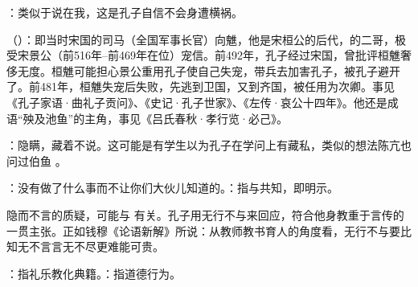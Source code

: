 {
}
{}


{
\item {}：类似于说在我，这是孔子自信不会身遭横祸。

\item {}（）：即当时宋国的司马（全国军事长官）向魋，他是宋桓公的后代，的二哥，极受宋景公（前516年--前469年在位）宠信。前492年，孔子经过宋国，曾批评桓魋奢侈无度。桓魋可能担心景公重用孔子使自己失宠，带兵去加害孔子，被孔子避开了。前481年，桓魋失宠后失败，先逃到卫国，又到齐国，被任用为次卿。事见《孔子家语·曲礼子贡问》、《史记·孔子世家》、《左传·哀公十四年》。他还是成语“殃及池鱼”的主角，事见《吕氏春秋·孝行览·必己》。%
}
{}


{
\begin{lyblobitemize}
\item {}：隐瞒，藏着不说。这可能是有学生以为孔子在学问上有藏私，类似的想法陈亢也问过伯鱼 。
\item {}：没有做了什么事而不让你们大伙儿知道的。：指与共知，即明示。
\end{lyblobitemize}
隐而不言的质疑，可能与  有关。孔子用无行不与来回应，符合他身教重于言传的一贯主张。正如钱穆《论语新解》所说：从教师教书育人的角度看，无行不与要比知无不言言无不尽更难能可贵。
}
{}


{
\item {}：指礼乐教化典籍。：指道德行为。
}
{}



